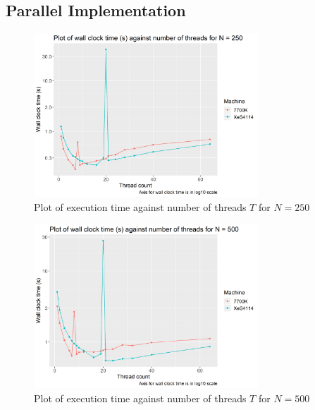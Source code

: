 \documentclass[12pt]{article}
\begin{document}
\pagebreak

\subsection{Parallel Implementation}

\begin{figure}[H]
    \centering
    \includegraphics[width=0.75\textwidth]{par-250N-varyThreads}
    \caption{Plot of execution time against number of threads $T$ for $N = 250$}
    \label{fig:par-250N-varyThreads}
\end{figure}

\begin{figure}[H]
    \centering
    \includegraphics[width=0.75\textwidth]{par-500N-varyThreads}
    \caption{Plot of execution time against number of threads $T$ for $N = 500$}
    \label{fig:par-500N-varyThreads}
\end{figure}
\end{document}
